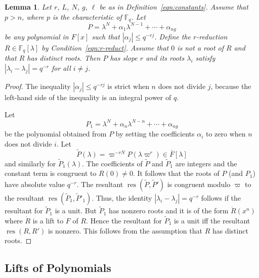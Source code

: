 \documentclass[11pt]{amsart}
\newtheorem{lemma}[theorem]{Lemma}
\theoremstyle{definition}
\theoremstyle{remark}
\numberwithin{equation}{theorem}
\def\Fq{{\mathbb F}_q}
\def\op#1{\operatorname{#1}}
\begin{document}
\begin{lemma}\label{lemma:converse}  Let $r$, $L$, $N$, $g$, $\ell$ be as
in Definition~\ref{eqn:constants}.  Assume that $p>n$, where $p$
is the characteristic of $\Fq$.  Let
    \begin{equation}P = \lambda^N + \alpha_1
\lambda^{N-1}+\cdots+\alpha_{ng}\end{equation}
be any polynomial in $F[x]$ such that $|\alpha_j|\le q^{-rj}$.
Define the $r$-reduction $R\in\Fq[\lambda]$ by
Condition~\ref{eqn:r-reduct}. Assume that $0$ is not a root of $R$
and that $R$ has distinct roots.  Then $P$ has slope $r$ and its
roots $\lambda_i$ satisfy $|\lambda_i-\lambda_j|=q^{-r}$ for all
$i\ne j$.
\end{lemma}

\begin{proof}
The inequality $|\alpha_j|\le q^{-rj}$ is strict when $n$ does not
divide $j$, because the left-hand side of the inequality is an
integral power of $q$.

Let
    \begin{equation}P_1 = \lambda^N + \alpha_{n} \lambda^{N-n}+\cdots
+\alpha_{ng}\end{equation}
be the polynomial obtained from $P$ by setting the coefficients
$\alpha_i$ to zero when $n$ does not divide $i$. Let
  \begin{equation}
  \tilde P(\lambda) = \varpi^{-r N}P(\lambda \varpi^r)\in \bar F[\lambda]
  \end{equation}
and similarly for $\tilde P_1(\lambda)$. The coefficients of
$\tilde P$ and $\tilde P_1$ are integers and the constant term is
congruent to $R(0)\ne0$.  It follows that the roots of $P$ (and
$P_1$) have absolute value $q^{-r}$. The resultant
    $\op{res}(\tilde P,\tilde P')$
is congruent modulo $\varpi$ to the resultant
    $\op{res}(\tilde P_1,\tilde P'_1)$.
Thus, the identity $|\lambda_i-\lambda_j|=q^{-r}$ follows if the
resultant for $\tilde P_1$ is a unit.  But $\tilde P_1$ has
nonzero roots and it is of the form $\dot R(x^n)$ where $\dot R$
is a lift to $F$ of $R$.  Hence the resultant for $\tilde P_1$ is
a unit iff the resultant $\op{res}(R,R')$ is nonzero.  This
follows from the assumption that $R$ has distinct roots.
\end{proof}


\subsection{Lifts of Polynomials}\label{sec:lift}
\end{document}
